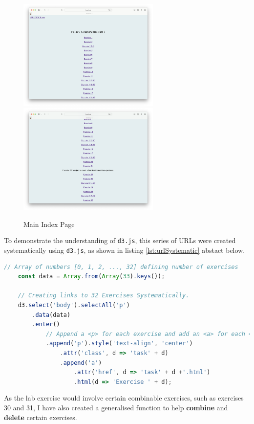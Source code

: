 \documentclass{scrreprt}
\begin{document}
\begin{figure}[!ht]
    \centering
    \includegraphics[width = 7cm]{images/part1_1.png}
    \includegraphics[width = 7cm]{images/part1_2.png}
    \label{fig:part1}
    \caption{Main Index Page}
\end{figure}
\FloatBarrier
To demonstrate the understanding of \verb|d3.js|, this series of URLs were created
systematically using \verb|d3.js|, as shown in listing \ref{lst:urlSystematic} abstact
below. 

\begin{lstlisting}[language=JavaScript,
                    caption={Systematic URL Creation},
                    captionpos=b,
                    label={lst:urlSystematic}]
    // Array of numbers [0, 1, 2, ..., 32] defining number of exercises
    const data = Array.from(Array(33).keys());

    // Creating links to 32 Exercises Systematically.
    d3.select('body').selectAll('p')
        .data(data)
        .enter()
            // Append a <p> for each exercise and add an <a> for each <p>
            .append('p').style('text-align', 'center')
                .attr('class', d => 'task' + d)
                .append('a')
                    .attr('href', d => 'task' + d +'.html')
                    .html(d => 'Exercise ' + d);
\end{lstlisting}

As the lab exercise would involve certain combinable exercises, such as exercises 30
and 31, I have also created a generalised function to help \textbf{combine} and
\textbf{delete} certain exercises.\\
\end{document}
